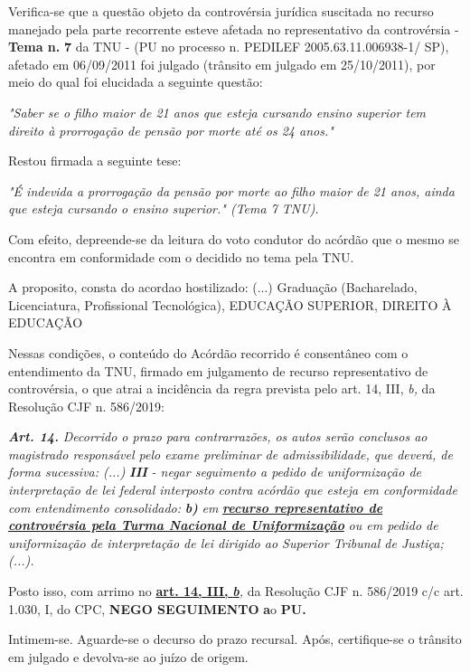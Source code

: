\documentclass[12pt]{article}
\begin{document}
\justifying
\noindent Verifica-se que a questão objeto da controvérsia jurídica suscitada no recurso manejado pela parte recorrente esteve afetada no representativo da controvérsia - \textbf{Tema n. }\textbf{7} da TNU - (PU no processo n. PEDILEF 2005.63.11.006938-1/ SP),  afetado em 06/09/2011 foi julgado (trânsito em julgado em 25/10/2011), por meio do qual foi elucidada a seguinte questão:

\noindent \textit{"Saber se o filho maior de 21 anos que esteja cursando ensino superior tem direito à prorrogação de pensão por morte até os 24 anos."}

\noindent Restou firmada a seguinte tese:

\noindent \textit{"É indevida a prorrogação da pensão por morte ao filho maior de 21 anos, ainda que esteja cursando o ensino superior." (Tema 7 TNU).}

\noindent Com efeito, depreende-se da leitura do voto condutor do acórdão que o mesmo se encontra em conformidade com o decidido no  tema pela TNU.

\noindent A proposito, consta do acordao hostilizado: (...) Graduação (Bacharelado, Licenciatura, Profissional Tecnológica), EDUCAÇÃO SUPERIOR, DIREITO À EDUCAÇÃO

\noindent Nessas condições, o conteúdo do Acórdão recorrido é consentâneo com o entendimento da TNU, firmado em julgamento de recurso representativo de controvérsia, o que atrai a incidência da regra prevista pelo art. 14, III, \textit{b,} da Resolução CJF n. 586/2019:

\noindent \textit{\textbf{Art. 14.}}\textit{ Decorrido o prazo para contrarrazões, os autos serão conclusos ao magistrado responsável pelo exame preliminar de admissibilidade, que deverá, de forma sucessiva: (...) }\textit{\textbf{III }}\textit{- negar seguimento a pedido de uniformização de interpretação de lei federal interposto contra acórdão que esteja em conformidade com entendimento consolidado: }\textit{\textbf{b)}}\textit{ em }\uline{\textit{\textbf{recurso representativo de controvérsia pela Turma Nacional de Uniformização}}}\textit{ ou em pedido de uniformização de interpretação de lei dirigido ao Superior Tribunal de Justiça;(...).}

\noindent Posto isso, com arrimo no \uline{\textbf{art. 14, III, }}\uline{\textit{\textbf{b}}}\textit{,} da Resolução CJF n. 586/2019 c/c art. 1.030, I, do CPC, \textbf{NEGO SEGUIMENTO }\textbf{a}o\textbf{ PU}\textbf{.}

\noindent Intimem-se. Aguarde-se o decurso do prazo recursal. Após, certifique-se o trânsito em julgado e devolva-se ao juízo de origem.
\end{document}
